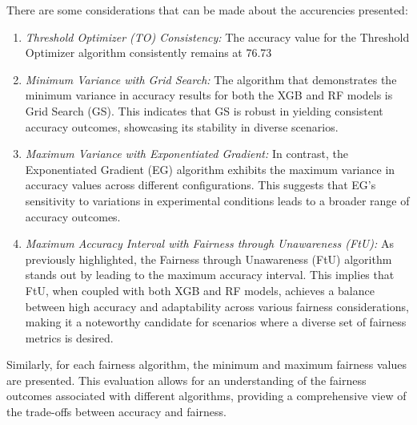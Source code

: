There are some considerations that can be made about the accurencies presented:
\begin{enumerate}
    \item \emph{Threshold Optimizer (TO) Consistency:} The accuracy value for the Threshold Optimizer algorithm consistently remains at 76.73%

    \item \emph{Minimum Variance with Grid Search:} The algorithm that demonstrates the minimum variance in accuracy results for both the XGB and RF models is Grid Search (GS). This indicates that GS is robust in yielding consistent accuracy outcomes, showcasing its stability in diverse scenarios.

    \item \emph{Maximum Variance with Exponentiated Gradient:} In contrast, the Exponentiated Gradient (EG) algorithm exhibits the maximum variance in accuracy values across different configurations. This suggests that EG's sensitivity to variations in experimental conditions leads to a broader range of accuracy outcomes.

    \item \emph{Maximum Accuracy Interval with Fairness through Unawareness (FtU):} As previously highlighted, the Fairness through Unawareness (FtU) algorithm stands out by leading to the maximum accuracy interval. This implies that FtU, when coupled with both XGB and RF models, achieves a balance between high accuracy and adaptability across various fairness considerations, making it a noteworthy candidate for scenarios where a diverse set of fairness metrics is desired.
\end{enumerate}

Similarly, for each fairness algorithm, the minimum and maximum fairness values are presented. This evaluation allows for an understanding of the fairness outcomes associated with different algorithms, providing a comprehensive view of the trade-offs between accuracy and fairness.
